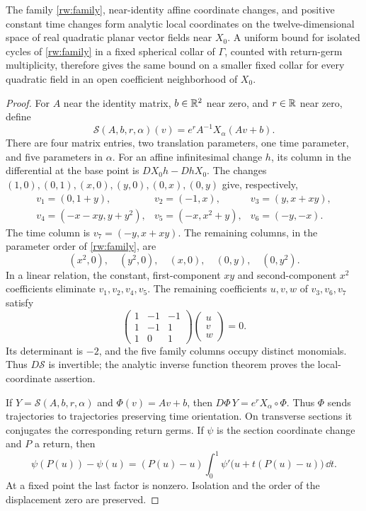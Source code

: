 \begin{proposition}\label{rw:slice}
The family \eqref{rw:family}, near-identity affine coordinate changes,
and positive constant time changes form analytic local coordinates on
the twelve-dimensional space of real quadratic planar vector fields
near $X_0$.  A uniform bound for isolated cycles of \eqref{rw:family}
in a fixed spherical collar of $\Gamma$, counted with return-germ
multiplicity, therefore gives the same bound on a smaller fixed collar
for every quadratic field in an open coefficient neighborhood of $X_0$.
\end{proposition}

\begin{proof}
For $A$ near the identity matrix, $b\in\mathbb R^2$ near zero, and $r\in\mathbb R$
near zero, define
\[
 \mathcal S(A,b,r,\alpha)(v)
       =e^r A^{-1}X_\alpha(Av+b).
\]
There are four matrix entries, two translation parameters, one time
parameter, and five parameters in $\alpha$.
For an affine infinitesimal change $h$, its column in the differential
at the base point is $DX_0h-DhX_0$.  The changes
$(1,0),(0,1),(x,0),(y,0),(0,x),(0,y)$ give, respectively,
\[
 \begin{array}{lll}
 v_1=(0,1+y),&v_2=(-1,x),&v_3=(y,x+xy),\\
 v_4=(-x-xy,y+y^2),&v_5=(-x,x^2+y),&v_6=(-y,-x).
 \end{array}
\]
The time column is $v_7=(-y,x+xy)$.  The remaining columns, in the
parameter order of \eqref{rw:family}, are
\[
 (x^2,0),\quad(y^2,0),\quad(x,0),\quad(0,y),\quad(0,y^2).
\]
In a linear relation, the constant, first-component $xy$ and
second-component $x^2$ coefficients eliminate $v_1,v_2,v_4,v_5$.
The remaining coefficients $u,v,w$ of $v_3,v_6,v_7$ satisfy
\[
 \begin{pmatrix}1&-1&-1\\1&-1&1\\1&0&1\end{pmatrix}
 \begin{pmatrix}u\\v\\w\end{pmatrix}=0.
\]
Its determinant is $-2$, and the five family columns occupy distinct
monomials. Thus $D\mathcal S$ is invertible; the analytic inverse
function theorem proves the local-coordinate assertion.

If $Y=\mathcal S(A,b,r,\alpha)$ and $\Phi(v)=Av+b$, then
$D\Phi\,Y=e^r X_\alpha\circ\Phi$.  Thus $\Phi$ sends trajectories to
trajectories preserving time orientation.  On transverse sections it
conjugates the corresponding return germs.  If $\psi$ is the section
coordinate change and $P$ a return, then
\begin{equation}\label{rw:geometry:section-unit}
 \psi(P(u))-\psi(u)
 =(P(u)-u)\int_0^1\psi'\bigl(u+t(P(u)-u)\bigr)\,\dd t.
\end{equation}
At a fixed point the last factor is nonzero.  Isolation and the order
of the displacement zero are preserved.


\end{proof}
